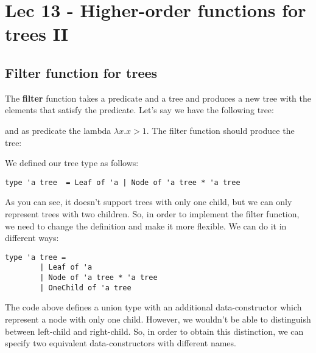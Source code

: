 \chapter{Lec 13 - Higher-order functions for trees II}
\section{Filter function for trees}
The \textbf{filter} function takes a predicate and a tree and produces a new tree with the elements that satisfy the predicate.\newline\newline
Let's say we have the following tree:\newline
{}\newline
and as predicate the lambda $\lambda x.x > 1$. The filter function should produce the tree:\newline
{}\newline
We defined our tree type as follows:
\begin{lstlisting}[style = FSharpStyle]
    type 'a tree  = Leaf of 'a | Node of 'a tree * 'a tree
\end{lstlisting}
As you can see, it doesn't support trees with only one child, but we can only represent trees with two children. So, in order to implement the filter function, we need to change the definition and make it more flexible. We can do it in different ways:
\begin{lstlisting}[style = FSharpStyle]
    type 'a tree =
        | Leaf of 'a
        | Node of 'a tree * 'a tree
        | OneChild of 'a tree
\end{lstlisting}
The code above defines a union type with an additional data-constructor which represent a node with only one child. However, we wouldn't be able to distinguish between left-child and right-child. So, in order to obtain this distinction, we can specify two equivalent data-constructors with different names.
